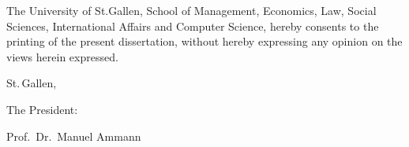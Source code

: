 
\clearpage
\thispagestyle{empty}

\noindent
The University of St.Gallen, School of Management, Economics, Law, Social Sciences,
International Affairs and Computer Science, hereby consents to the printing of the present
dissertation, without hereby expressing any opinion on the views herein expressed.

\vspace{15mm}
\noindent
St.\,Gallen,
\makeatletter
\@degreedate{}
\makeatother

\vspace{10mm}

\hspace{.5\linewidth} The President:

\vspace{20mm}

\hspace{.5\linewidth} Prof.\ Dr.\ Manuel Ammann